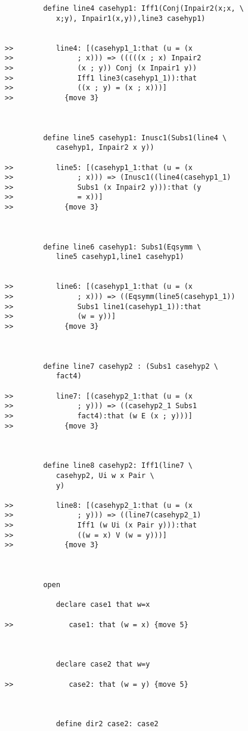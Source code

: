 \documentclass[12pt]{article}
\begin{document}
\begin{verbatim}
         define line4 casehyp1: Iff1(Conj(Inpair2(x;x, \
            x;y), Inpair1(x,y)),line3 casehyp1)


>>          line4: [(casehyp1_1:that (u = (x
>>               ; x))) => (((((x ; x) Inpair2
>>               (x ; y)) Conj (x Inpair1 y))
>>               Iff1 line3(casehyp1_1)):that
>>               ((x ; y) = (x ; x)))]
>>            {move 3}



         define line5 casehyp1: Inusc1(Subs1(line4 \
            casehyp1, Inpair2 x y))

>>          line5: [(casehyp1_1:that (u = (x
>>               ; x))) => (Inusc1((line4(casehyp1_1)
>>               Subs1 (x Inpair2 y))):that (y
>>               = x))]
>>            {move 3}



         define line6 casehyp1: Subs1(Eqsymm \
            line5 casehyp1,line1 casehyp1)


>>          line6: [(casehyp1_1:that (u = (x
>>               ; x))) => ((Eqsymm(line5(casehyp1_1))
>>               Subs1 line1(casehyp1_1)):that
>>               (w = y))]
>>            {move 3}



         define line7 casehyp2 : (Subs1 casehyp2 \
            fact4)

>>          line7: [(casehyp2_1:that (u = (x
>>               ; y))) => ((casehyp2_1 Subs1
>>               fact4):that (w E (x ; y)))]
>>            {move 3}



         define line8 casehyp2: Iff1(line7 \
            casehyp2, Ui w x Pair \
            y)

>>          line8: [(casehyp2_1:that (u = (x
>>               ; y))) => ((line7(casehyp2_1)
>>               Iff1 (w Ui (x Pair y))):that
>>               ((w = x) V (w = y)))]
>>            {move 3}



         open

            declare case1 that w=x

>>             case1: that (w = x) {move 5}



            declare case2 that w=y

>>             case2: that (w = y) {move 5}



            define dir2 case2: case2


\end{verbatim}
\end{document}
